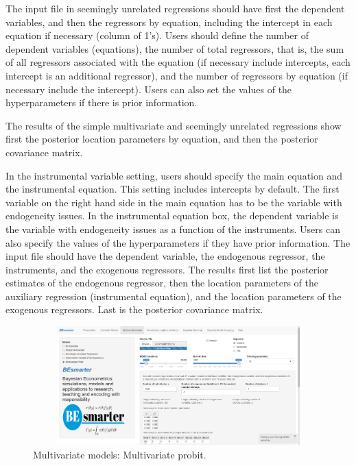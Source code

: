 The input file in seemingly unrelated regressions should have first the dependent variables, and then the regressors by equation, including the intercept in each equation if necessary (column of 1's). Users should define the number of dependent variables (equations), the number of total regressors, that is, the sum of all regressors associated with the equation (if necessary include intercepts, each intercept is an additional regressor), and the number of regressors by equation (if necessary include the intercept). Users can also set the values  of the hyperparameters if there is prior information.

The results of the simple multivariate and seemingly unrelated regressions show first the posterior location parameters by equation, and then the posterior covariance matrix.

In the instrumental variable setting, users should specify the main equation and the instrumental equation. This setting includes intercepts by default. The first variable on the right hand side in the main equation has to be the variable with endogeneity issues. In the instrumental equation box, the dependent variable is the variable with endogeneity issues as a function of the instruments. Users can also specify the values of the hyperparameters if they have prior information. The input file should have the dependent variable, the endogenous regressor, the instruments, and the exogenous regressors. The results first list the posterior estimates of the endogenous regressor, then the location parameters of the auxiliary regression (instrumental equation), and the location parameters of the exogenous regressors. Last is the posterior covariance matrix.

\begin{figure}
	\includegraphics[width=340pt, height=130pt]{Chapters/chapterGUI/figures/Figure7.png}
	\caption[List of figure caption goes here]{Multivariate models: Multivariate probit.}\label{fig67}
\end{figure} 

